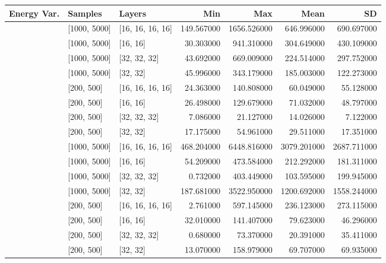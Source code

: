 \begin{tabular}{lllrrrr}
\toprule
Energy Var. & Samples & Layers & Min & Max & Mean & SD \\
\midrule
[0.001, 0.0001] & [1000, 5000] & [16, 16, 16, 16] & 149.567000 & 1656.526000 & 646.996000 & 690.697000 \\
[0.001, 0.0001] & [1000, 5000] & [16, 16] & 30.303000 & 941.310000 & 304.649000 & 430.109000 \\
[0.001, 0.0001] & [1000, 5000] & [32, 32, 32] & 43.692000 & 669.009000 & 224.514000 & 297.752000 \\
[0.001, 0.0001] & [1000, 5000] & [32, 32] & 45.996000 & 343.179000 & 185.003000 & 122.273000 \\
[0.001, 0.0001] & [200, 500] & [16, 16, 16, 16] & 24.363000 & 140.808000 & 60.049000 & 55.128000 \\
[0.001, 0.0001] & [200, 500] & [16, 16] & 26.498000 & 129.679000 & 71.032000 & 48.797000 \\
[0.001, 0.0001] & [200, 500] & [32, 32, 32] & 7.086000 & 21.127000 & 14.026000 & 7.122000 \\
[0.001, 0.0001] & [200, 500] & [32, 32] & 17.175000 & 54.961000 & 29.511000 & 17.351000 \\
[0.1, 0.01] & [1000, 5000] & [16, 16, 16, 16] & 468.204000 & 6448.816000 & 3079.201000 & 2687.711000 \\
[0.1, 0.01] & [1000, 5000] & [16, 16] & 54.209000 & 473.584000 & 212.292000 & 181.311000 \\
[0.1, 0.01] & [1000, 5000] & [32, 32, 32] & 0.732000 & 403.449000 & 103.595000 & 199.945000 \\
[0.1, 0.01] & [1000, 5000] & [32, 32] & 187.681000 & 3522.950000 & 1200.692000 & 1558.244000 \\
[0.1, 0.01] & [200, 500] & [16, 16, 16, 16] & 2.761000 & 597.145000 & 236.123000 & 273.115000 \\
[0.1, 0.01] & [200, 500] & [16, 16] & 32.010000 & 141.407000 & 79.623000 & 46.296000 \\
[0.1, 0.01] & [200, 500] & [32, 32, 32] & 0.680000 & 73.370000 & 20.391000 & 35.411000 \\
[0.1, 0.01] & [200, 500] & [32, 32] & 13.070000 & 158.979000 & 69.707000 & 69.935000 \\
\bottomrule
\end{tabular}
